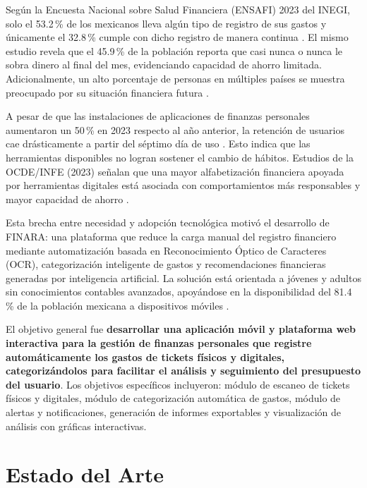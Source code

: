 \documentclass[10pt,twocolumn,letterpaper]{article}
\begin{document}
Según la Encuesta Nacional sobre Salud Financiera (ENSAFI) 2023 del INEGI, solo el 53.2\,\% de los
mexicanos lleva algún tipo de registro de sus gastos y únicamente el 32.8\,\% cumple con dicho
registro de manera continua \cite{inegi2024}. El mismo estudio revela que el 45.9\,\% de la
población reporta que casi nunca o nunca le sobra dinero al final del mes, evidenciando capacidad
de ahorro limitada. Adicionalmente, un alto porcentaje de personas en múltiples países se muestra
preocupado por su situación financiera futura \cite{statista2025}.

A pesar de que las instalaciones de aplicaciones de finanzas personales aumentaron un 50\,\% en
2023 respecto al año anterior, la retención de usuarios cae drásticamente a partir del séptimo día
de uso \cite{adjust2023}. Esto indica que las herramientas disponibles no logran sostener el cambio
de hábitos. Estudios de la OCDE/INFE (2023) señalan que una mayor alfabetización financiera
apoyada por herramientas digitales está asociada con comportamientos más responsables y mayor
capacidad de ahorro \cite{OECD_INFE2023}.

Esta brecha entre necesidad y adopción tecnológica motivó el desarrollo de FINARA: una plataforma
que reduce la carga manual del registro financiero mediante automatización basada en Reconocimiento
Óptico de Caracteres (OCR), categorización inteligente de gastos y recomendaciones financieras
generadas por inteligencia artificial. La solución está orientada a jóvenes y adultos sin
conocimientos contables avanzados, apoyándose en la disponibilidad del 81.4\,\% de la población
mexicana a dispositivos móviles \cite{EncINEGI}.

El objetivo general fue \textbf{desarrollar una aplicación móvil y plataforma web interactiva para
la gestión de finanzas personales que registre automáticamente los gastos de tickets físicos y
digitales, categorizándolos para facilitar el análisis y seguimiento del presupuesto del usuario}.
Los objetivos específicos incluyeron: módulo de escaneo de tickets físicos y digitales, módulo de
categorización automática de gastos, módulo de alertas y notificaciones, generación de informes
exportables y visualización de análisis con gráficas interactivas.


\section{Estado del Arte}
\end{document}
